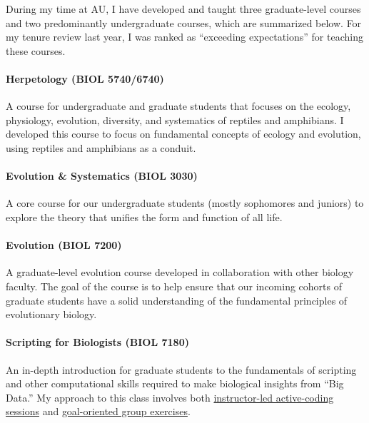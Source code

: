 During my time at AU,
I have developed and taught three graduate-level courses
and two predominantly undergraduate courses,
which are summarized below.
For my tenure review last year, I was ranked as ``exceeding
expectations'' for teaching these courses.

\paragraph*{Herpetology (BIOL 5740/6740)}
A course for undergraduate and graduate students that focuses on the ecology,
physiology, evolution, diversity, and systematics of reptiles and amphibians.
I developed this course to focus on fundamental concepts of ecology and
evolution, using reptiles and amphibians as a conduit.

\paragraph*{Evolution \& Systematics (BIOL 3030)}
A core course for our undergraduate students (mostly sophomores and juniors) to
explore the theory that unifies the form and function of all life.

\paragraph*{Evolution (BIOL 7200)}
A graduate-level evolution course developed in collaboration with other biology
faculty.
The goal of the course is to help ensure that our incoming cohorts of graduate
students have a solid understanding of the fundamental principles of
evolutionary biology.

\paragraph*{Scripting for Biologists (BIOL 7180)}
An in-depth introduction for graduate students to the fundamentals of scripting
and other computational skills required to make biological insights from ``Big
Data.''
My approach to this class involves both
\href{http://phyletica.org/slides/python/intro/}{instructor-led active-coding
    sessions}
and
\href{https://github.com/joaks1/python-translation-project}{goal-oriented group
    exercises}.

